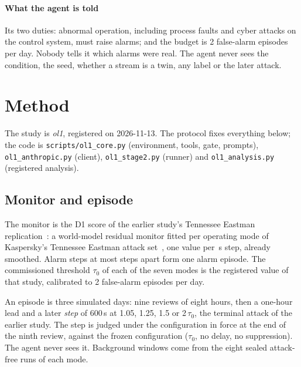\documentclass[sigconf]{acmart}
\newcommand{\tauz}{\ensuremath{\tau_0}}
\begin{document}
\paragraph{What the agent is told}
Its two duties: abnormal operation, including process faults and cyber attacks on the control system, must
raise alarms; and the budget is 2 false-alarm episodes per day. Nobody tells it which alarms were real.
The agent never sees the condition, the seed, whether a stream is a twin, any label or the later attack.

\section{Method}
\label{sec:method}

The study is \emph{ol1}, registered on 2026-11-13. The protocol fixes everything below; the code is
\texttt{scripts/ol1\_core.py} (environment, tools, gate, prompts), \texttt{ol1\_anthropic.py} (client),
\texttt{ol1\_stage2.py} (runner) and \texttt{ol1\_analysis.py} (registered analysis).

\subsection{Monitor and episode}

The monitor is the D1 score of the earlier study's Tennessee Eastman replication~\cite{kulshrestha2026tt1}:
a world-model residual monitor fitted per operating mode of Kaspersky's Tennessee Eastman attack
set~\cite{filonov2017tep, downs1993tep}, one value per \VStep\,s step, already smoothed. Alarm steps at most
\VGap{} steps apart form one alarm episode. The commissioned threshold \tauz{} of each of the seven modes is
the registered value of that study, calibrated to 2 false-alarm episodes per day.

An episode is three simulated days: nine reviews of eight hours, then a one-hour lead and a later
\emph{step} of 600\,s at 1.05, 1.25, 1.5 or 2\,\tauz{}, the terminal attack of the earlier study. The step
is judged under the configuration in force at the end of the ninth review, against the frozen
configuration (\tauz{}, no delay, no suppression). The agent never sees it. Background windows come from
the eight sealed attack-free runs of each mode.
\end{document}
